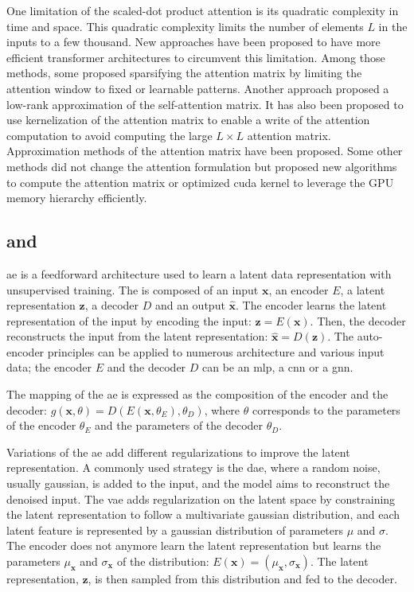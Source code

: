 \documentclass[../main.tex]{subfiles}
\begin{document}
	 One limitation of the scaled-dot product attention is its quadratic complexity in time and space.
	 This quadratic complexity limits the number of elements \(L\) in the inputs to a few thousand.
	 New approaches have been proposed to have more efficient transformer architectures to circumvent this limitation.
	 Among those methods, some proposed sparsifying the attention matrix by limiting the attention window to fixed or learnable patterns.
	 Another approach proposed a low-rank approximation of the self-attention matrix.
	 It has also been proposed to use kernelization of the attention matrix to enable a write of the attention computation to avoid computing the large \(L \times L\) attention matrix.
	 Approximation methods of the attention matrix have been proposed.
	 Some other methods did not change the attention formulation but proposed new algorithms to compute the attention matrix or optimized cuda kernel to leverage the GPU memory hierarchy efficiently.

 \subsection{ and }
	 \Gls{ae} is a feedforward architecture used to learn a latent data representation with unsupervised training.
	 The  is composed of an input \(\symbf{x}\), an encoder \(E\), a latent representation \(\symbf{z}\), a decoder \(D\) and an output \(\symbf{\hat{x}}\).
	 The encoder learns the latent representation of the input by encoding the input: \(\symbf{z} = E\left(\symbf{x}\right)\).
	 Then, the decoder reconstructs the input from the latent representation: \(\symbf{\hat{x}} = D\left(\symbf{z}\right)\).
	 The auto-encoder principles can be applied to numerous architecture and various input data; the encoder \(E\) and the decoder \(D\) can be an \gls{mlp}, a \gls{cnn} or a \gls{gnn}.

	 The mapping of the \gls{ae} is expressed as the composition of the encoder and the decoder: \(g\left(\symbf{x}, \theta\right) = D\left(E\left(\symbf{x}, \theta_E\right), \theta_D\right)\), where \(\theta\) corresponds to the parameters of the encoder \(\theta_E\) and the parameters of the decoder \(\theta_D\).

	 Variations of the \gls{ae} add different regularizations to improve the latent representation.
	 A commonly used strategy is the \gls{dae}, where a random noise, usually gaussian, is added to the input, and the model aims to reconstruct the denoised input.
	 The \gls{vae} adds regularization on the latent space by constraining the latent representation to follow a multivariate gaussian distribution, and each latent feature is represented by a gaussian distribution of parameters \(\mu\) and \(\sigma\).
	 The encoder does not anymore learn the latent representation but learns the parameters \(\mu_{\symbf{x}}\) and \(\sigma_{\symbf{x}}\) of the distribution: \(E\left(\symbf{x}\right) = \left(\mu_{\symbf{x}},\sigma_{\symbf{x}}\right) \).
	 The latent representation, \(\symbf{z}\), is then sampled from this distribution and fed to the decoder.
\end{document}
